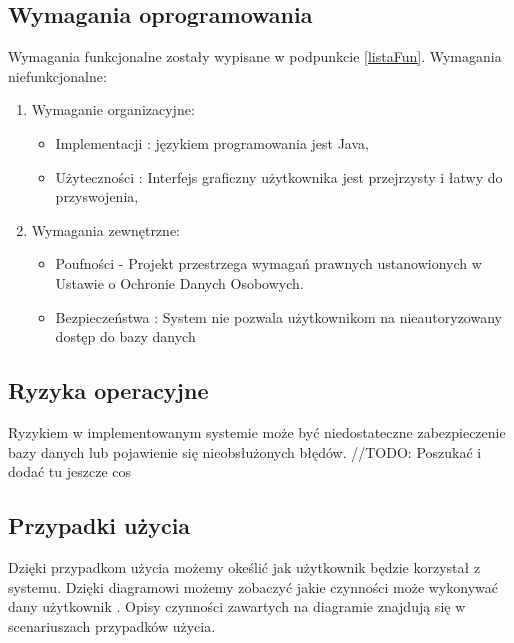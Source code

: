 \subsection{Wymagania oprogramowania}
Wymagania funkcjonalne zostały wypisane w podpunkcie \ref{listaFun}.
Wymagania niefunkcjonalne:
\begin{enumerate}
	\item Wymaganie organizacyjne:
		\begin{itemize}
			\item Implementacji : językiem programowania jest Java,
			\item Użyteczności : Interfejs graficzny użytkownika jest przejrzysty i łatwy do przyswojenia,
		\end{itemize}
	\item Wymagania zewnętrzne:		
		\begin{itemize}
			\item Poufności - Projekt przestrzega wymagań prawnych ustanowionych w Ustawie o Ochronie Danych Osobowych.
			\item Bezpieczeństwa : System nie pozwala użytkownikom na nieautoryzowany dostęp do bazy danych
		\end{itemize}
\end{enumerate}
\subsection{Ryzyka operacyjne}
Ryzykiem w implementowanym systemie może być niedostateczne zabezpieczenie bazy danych lub pojawienie się nieobsłużonych błędów.
//TODO: Poszukać i dodać tu jeszcze cos
\subsection{Przypadki użycia}
Dzięki przypadkom użycia możemy okeślić jak użytkownik będzie korzystał z systemu. Dzięki diagramowi możemy zobaczyć jakie czynności może wykonywać dany użytkownik \cite{DOC03}. Opisy czynności zawartych na diagramie znajdują się w scenariuszach przypadków użycia.

